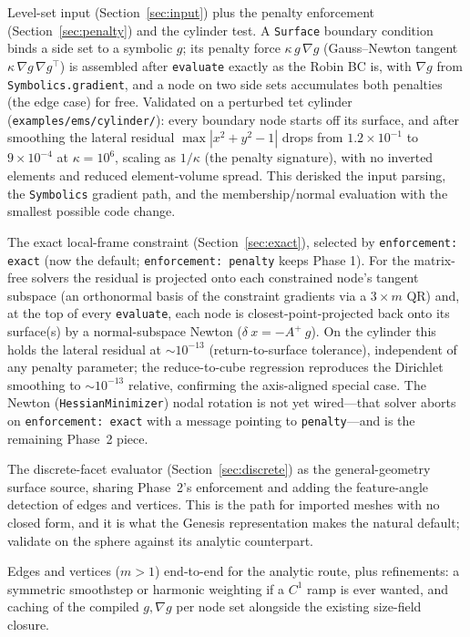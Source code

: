 \documentclass[11pt]{article}
\newcommand{\grad}{\nabla}
\newcommand{\code}[1]{\texttt{#1}}
\begin{document}
\begin{description}[style=unboxed,leftmargin=0pt,itemsep=2pt]
  \item[Phase 1 \emph{(implemented)}.] Level-set input
  (Section~\ref{sec:input}) plus the penalty enforcement
  (Section~\ref{sec:penalty}) and the cylinder test. A \code{Surface} boundary
  condition binds a side set to a symbolic $g$; its penalty force $\kappa\,g\,
  \grad g$ (Gauss--Newton tangent $\kappa\,\grad g\,\grad g^{\top}$) is assembled
  after \code{evaluate} exactly as the Robin BC is, with $\grad g$ from
  \code{Symbolics.gradient}, and a node on two side sets accumulates both
  penalties (the edge case) for free. Validated on a perturbed tet cylinder
  (\code{examples/\allowbreak ems/\allowbreak cylinder/}): every boundary node
  starts off its surface, and after smoothing the lateral residual
  $\max|x^2+y^2-1|$ drops from $1.2\times10^{-1}$ to $9\times10^{-4}$ at
  $\kappa=10^6$, scaling as $1/\kappa$ (the penalty signature), with no inverted
  elements and reduced element-volume spread. This derisked the input parsing,
  the \code{Symbolics} gradient path, and the membership/normal evaluation with
  the smallest possible code change.
  \item[Phase 2 \emph{(matrix-free implemented)}.] The exact local-frame
  constraint (Section~\ref{sec:exact}), selected by \code{enforcement: exact}
  (now the default; \code{enforcement: penalty} keeps Phase 1). For the
  matrix-free solvers the residual is projected onto each constrained node's
  tangent subspace (an orthonormal basis of the constraint gradients via a $3
  \times m$ QR) and, at the top of every \code{evaluate}, each node is
  closest-point-projected back onto its surface(s) by a normal-subspace Newton
  ($\delta~x = -A^{+}~g$). On the cylinder this holds the lateral residual at
  $\sim\!10^{-13}$ (return-to-surface tolerance), independent of any penalty
  parameter; the reduce-to-cube regression reproduces the Dirichlet smoothing to
  $\sim\!10^{-13}$ relative, confirming the axis-aligned special case. The Newton
  (\code{HessianMinimizer}) nodal rotation is not yet wired---that solver aborts
  on \code{enforcement: exact} with a message pointing to \code{penalty}---and is
  the remaining Phase~2 piece.
  \item[Phase 3.] The discrete-facet evaluator
  (Section~\ref{sec:discrete}) as the general-geometry surface source, sharing
  Phase~2's enforcement and adding the feature-angle detection of edges and
  vertices. This is the path for imported meshes with no closed form, and it is
  what the Genesis representation makes the natural default; validate on the
  sphere against its analytic counterpart.
  \item[Phase 4 (optional).] Edges and vertices ($m>1$) end-to-end for the
  analytic route, plus refinements: a symmetric smoothstep or harmonic weighting
  if a $C^1$ ramp is ever wanted, and caching of the compiled $g,\grad g$ per
  node set alongside the existing size-field closure.
\end{description}
\end{document}

